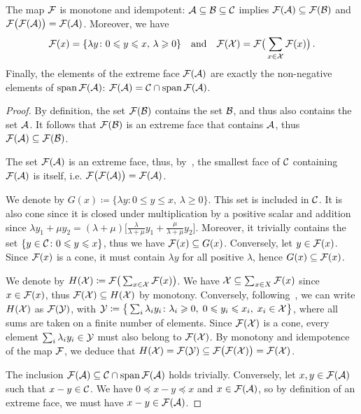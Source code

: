 \documentclass[main]{subfiles}
\begin{document}
\begin{lemma}
\label{lem:F_basic}
The map $\mathcal{F}$ is monotone and idempotent: $\mathcal{A} \subseteq \mathcal{B} \subseteq \mathcal{C}$ implies $\mathcal{F}(\mathcal{A}) \subseteq \mathcal{F}(\mathcal{B})$ and $\mathcal{F}\big(\mathcal{F}(\mathcal{A}) \big) = \mathcal{F}(\mathcal{A})$. Moreover, we have
\begin{align*}
\mathcal{F}(x) = \{ \lambda y \colon 0 \leqslant y \leqslant x, \, \lambda \geqslant 0 \}
\quad\text{and}\quad
\mathcal{F}(\mathcal{X}) = \mathcal{F}\big( \sum_{x \in \mathcal{X}} \mathcal{F}(x) \big) \,.
\end{align*}
Finally, the elements of the extreme face $\mathcal{F}(\mathcal{A})$ are exactly the non-negative elements of  $\operatorname{span} \mathcal{F}(\mathcal{A})$: $\mathcal{F}(\mathcal{A}) = \mathcal{C} \cap \operatorname{span} \mathcal{F}(\mathcal{A})$.
\end{lemma}
\begin{proof}
By definition, the set $\mathcal{F}(\mathcal{B})$ contains the set $\mathcal{B}$, and thus also contains the set $\mathcal{A}$. It follows that $\mathcal{F}(\mathcal{B})$  is an extreme face that contains $\mathcal{A}$, thus $\mathcal{F}(\mathcal{A}) \subseteq \mathcal{F}(\mathcal{B})$.

The set $\mathcal{F}(\mathcal{A})$ is an extreme face, thus, by~, the smallest face of $\mathcal{C}$ containing $\mathcal{F}(\mathcal{A})$ is itself, i.e. $\mathcal{F}\big(\mathcal{F}(\mathcal{A})\big) = \mathcal{F}(\mathcal{A})$.

We denote by $G(x) \coloneqq \{ \lambda y \colon 0 \leq y \leq x, \, \lambda \geq 0 \}$. This set is included in $\mathcal{C}$. It is also cone since it is closed under multiplication by a positive scalar and addition since $\lambda y_1 + \mu y_2 = (\lambda + \mu) 
 \big[ \frac{\lambda}{\lambda + \mu} y_1 + \frac{\mu}{\lambda + \mu} y_2 \big]$. Moreover, it trivially contains the set $\{ y \in \mathcal{C} \colon 0 \leqslant y \leqslant x \}$, thus we have $\mathcal{F}(x) \subseteq G(x)$. Conversely, let $y \in \mathcal{F}(x)$. Since $\mathcal{F}(x)$ is a cone, it must contain $\lambda y$ for all positive $\lambda$, hence $G(x) \subseteq \mathcal{F}(x)$.
 
We denote by $H(\mathcal{X}) \coloneqq \mathcal{F}\big( \sum_{x \in \mathcal{X}} \mathcal{F}(x) \big)$. We have $\mathcal{X} \subseteq \sum_{x \in X} \mathcal{F}(x)$ since $x \in \mathcal{F}(x)$, thus $\mathcal{F}(\mathcal{X}) \subseteq H(\mathcal{X})$ by monotony. 
Conversely, following~, we can write $H(\mathcal{X})$ as $\mathcal{F}(\mathcal{Y})$, with $\mathcal{Y} \coloneqq \big\{ \sum_i \lambda_i y_i \colon \lambda_i \geqslant 0, \; 0 \leqslant y_i \leqslant x_i,\; x_i \in \mathcal{X} \big\}$, where all sums are taken on a finite number of elements. Since $\mathcal{F}(\mathcal{X})$ is a cone, every element $\sum_i  \lambda_i y_i \in \mathcal{Y}$ must also belong to $\mathcal{F}(\mathcal{X})$. By monotony and idempotence of the map $\mathcal{F}$, we deduce that $H(\mathcal{X}) = \mathcal{F}(\mathcal{Y}) \subseteq \mathcal{F}\big( \mathcal{F}(\mathcal{X}) \big) = \mathcal{F}(\mathcal{X})$.

The inclusion $\mathcal{F}(\mathcal{A}) \subseteq \mathcal{C}\cap \operatorname{span} \mathcal{F}(\mathcal{A})$ holds trivially. Conversely, let $x,y \in \mathcal{F}(\mathcal{A})$ such that $x - y \in \mathcal{C}$. We have $0 \preceq x-y \preceq x$ and $x \in \mathcal{F}(\mathcal{A})$, so by definition of an extreme face, we must have $x-y \in \mathcal{F}(\mathcal{A})$.
\end{proof}
\end{document}
